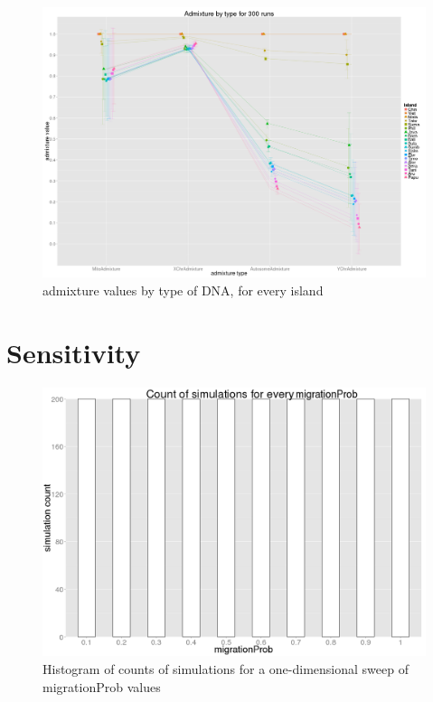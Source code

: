 \documentclass[a4paper,12pt]{report}
\begin{document}
\begin{figure}[ht]
	\centering
	\includegraphics[scale=0.22]{../data/stability-admixGradient.png}
	\caption{admixture values by type of DNA, for every island}
	\label{app:stability-admixGradient}
\end{figure}

\section{Sensitivity}
\begin{figure}[ht]
	\centering
	\includegraphics[scale=0.3]{../data/count-1d.png}
	\caption{Histogram of counts of simulations for a one-dimensional sweep of migrationProb values}
	\label{app:count-1d}
\end{figure}
\end{document}
